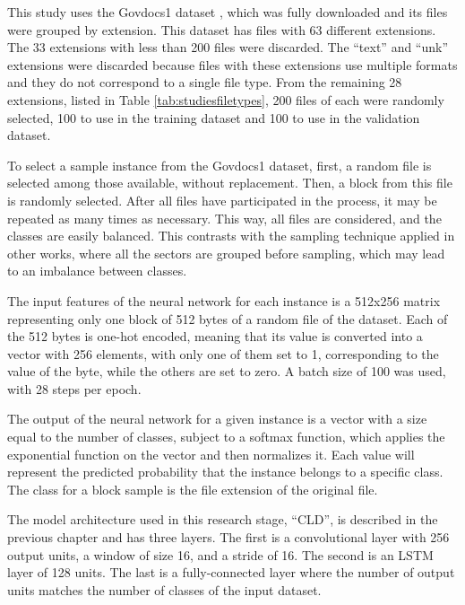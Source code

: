 
This study uses the Govdocs1 dataset \cite{garfinkel_bringing_2009}, which was fully downloaded and its files were grouped by extension. This dataset has files with 63 different extensions. The 33 extensions with less than 200 files were discarded. The  ``text'' and ``unk'' extensions were discarded because files with these extensions use multiple formats and they do not correspond to a single file type. From the remaining 28 extensions, listed in Table \ref{tab:studiesfiletypes}, 200 files of each were randomly selected, 100 to use in the training dataset and 100 to use in the validation dataset.

% 

To select a sample instance from the Govdocs1 dataset, first, a random file is selected among those available, without replacement. Then, a block from this file is randomly selected. After all files have participated in the process, it may be repeated as many times as necessary. This way, all files are considered, and the classes are easily balanced.
This contrasts with the sampling technique applied in other works, where all the sectors are grouped before sampling, which may lead to an imbalance between classes.

The input features of the neural network for each instance is a 512x256 matrix representing only one block of 512 bytes of a random file of the dataset. Each of the 512 bytes is one-hot encoded, meaning that its value is converted into a vector with 256 elements, with only one of them set to 1, corresponding to the value of the byte, while the others are set to zero. A batch size of 100 was used, with 28 steps per epoch.

The output of the neural network for a given instance is a vector with a size equal to the number of classes, subject to a softmax function, which applies the exponential function on the vector and then normalizes it. Each value will represent the predicted probability that the instance belongs to a specific class. The class for a block sample is the file extension of the original file.

The model architecture used in this research stage, ``CLD'', is described in the previous chapter and has three layers. The first is a convolutional layer with 256 output units, a window of size 16, and a stride of 16. The second is an LSTM layer of 128 units. The last is a fully-connected layer where the number of output units matches the number of classes of the input dataset.

